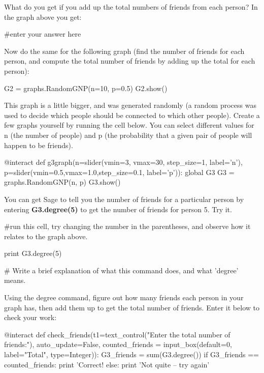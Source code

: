 What do you get if you add up the total numbers of friends from each person? In
the graph above you get:

\begin{sageverbatim}
#enter your answer here

\end{sageverbatim}

Now do the same for the following graph (find the number of friends
for each person, and compute the total number of friends by adding up
the total for each person):
\begin{sageverbatim}
G2 = graphs.RandomGNP(n=10, p=0.5)
G2.show()
\end{sageverbatim}

This graph is a little bigger, and was generated randomly (a random
process was used to decide which people should be connected to which
other people).  Create a few graphs yourself by running the cell
below.  You can select different values for n (the number of people)
and p (the probability that a given pair of people will happen to be
friends).

\begin{sageverbatim}
@interact
def g3graph(n=slider(vmin=3, vmax=30, step_size=1, label='n'), p=slider(vmin=0.5,vmax=1.0,step_size=0.1, label='p')):
    global G3 
    G3 = graphs.RandomGNP(n, p)
    G3.show()
\end{sageverbatim}

You can get Sage to tell you the number of friends for a particular person by entering \textbf{G3.degree(5)}
to get the number of friends for person 5.  Try it.

\begin{sageverbatim}
#run this cell, try changing the number in the parentheses, and observe how it relates to the graph above.

print G3.degree(5)

# Write a brief explanation of what this command does, and what 'degree' means.
\end{sageverbatim}

Using the degree command, figure out how many friends each person in
your graph has, then add them up to get the total number of friends.
Enter it below to check your work:

\begin{sageverbatim}
@interact
def check_friends(t1=text_control("Enter the total number of friends:"), auto_update=False, 
    counted_friends = input_box(default=0, label="Total", type=Integer)):
    G3_friends = sum(G3.degree())
    if G3_friends == counted_friends:
        print 'Correct!
    else:
        print 'Not quite -- try again'
\end{sageverbatim}
















